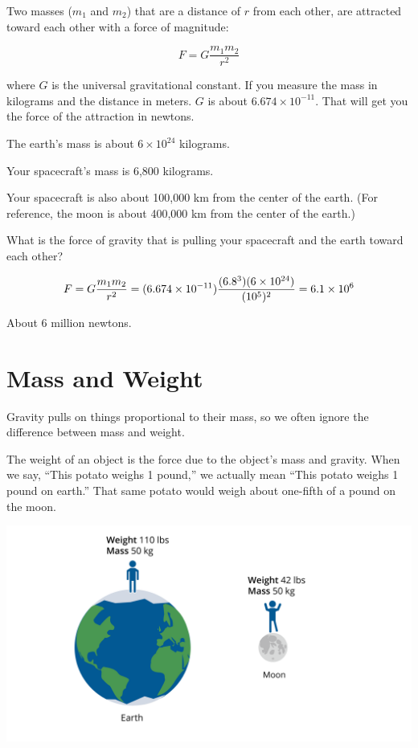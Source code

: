 \begin{mdframed}[style=important, frametitle={Newton's Law of Universal Gravitation}]

Two masses ($m_1$ and $m_2$) that are a distance of
$r$ from each other, are attracted toward each other with a force of
magnitude:

$$F = G\frac{m_1 m_2}{r^2}$$

where $G$ is the universal gravitational constant. If you measure the
mass in kilograms and the distance in meters. $G$ is about $6.674
\times 10^{-11}$.  That will get you the force of the attraction in
newtons.

\end{mdframed}

\begin{Exercise}[title={Gravity}, label=gravity_earth]
  
  The earth's mass is about $6 \times 10^{24}$ kilograms.

  Your spacecraft's mass is 6,800 kilograms.

  Your spacecraft is also about 100,000 km from the center of the earth. (For reference, the moon is about 400,000 km from the center of the earth.)

  What is the force of gravity that is pulling your spacecraft and the earth toward each other?

\end{Exercise}
\begin{Answer}[ref=gravity_earth]

  $$F = G\frac{m_1 m_2}{r^2} = (6.674 \times 10^{-11})\frac{(6.8 \time 10^3)(6 \times 10^{24})}{(10^5)^2} = 6.1 \times 10^{6}$$

  About 6 million newtons.
  
\end{Answer}

\section{Mass and Weight}

Gravity pulls on things proportional to their mass, so we often
ignore the difference between mass and weight.

The weight of an object is the force due to the object's mass and
gravity.  When we say, ``This potato weighs 1 pound,'' we actually mean
``This potato weighs 1 pound on earth.''  That same potato would weigh
about one-fifth of a pound on the moon.

\includegraphics[width=1\textwidth]{massvweight.png}

